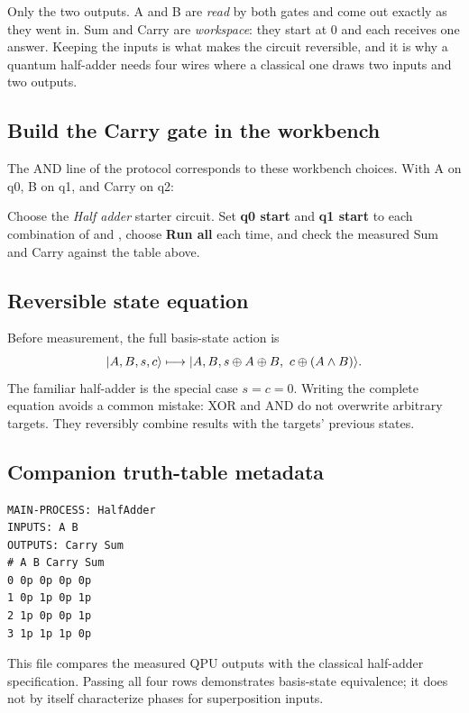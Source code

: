 \begin{beginnerbox}
Only the two outputs. A and B are \emph{read} by both gates and come out
exactly as they went in. Sum and Carry are \emph{workspace}: they start at 0
and each receives one answer. Keeping the inputs is what makes the circuit
reversible, and it is why a quantum half-adder needs four wires where a
classical one draws two inputs and two outputs.
\end{beginnerbox}

\subsection{Build the Carry gate in the workbench}

The AND line of the protocol corresponds to these workbench choices. With A
on q0, B on q1, and Carry on q2:
\begin{center}
\end{center}
\begin{trybox}
Choose the \emph{Half adder} starter circuit. Set \textbf{q0 start} and
\textbf{q1 start} to each combination of  and , choose
\textbf{Run all} each time, and check the measured Sum and Carry against the
table above.
\end{trybox}

\subsection{Reversible state equation}

Before measurement, the full basis-state action is
\[
\lvert A,B,s,c\rangle\longmapsto
\lvert A,B,s\oplus A\oplus B,\ c\oplus(A\land B)\rangle.
\]
The familiar half-adder is the special case $s=c=0$. Writing the complete
equation avoids a common mistake: XOR and AND do not overwrite arbitrary
targets. They reversibly combine results with the targets' previous states.

\subsection{Companion truth-table metadata}

\begin{lstlisting}
MAIN-PROCESS: HalfAdder
INPUTS: A B
OUTPUTS: Carry Sum
# A B Carry Sum
0 0p 0p 0p 0p
1 0p 1p 0p 1p
2 1p 0p 0p 1p
3 1p 1p 1p 0p
\end{lstlisting}
This file compares the measured QPU outputs with the classical half-adder
specification. Passing all four rows demonstrates basis-state equivalence; it
does not by itself characterize phases for superposition inputs.

